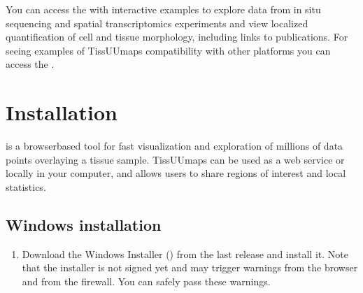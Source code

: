 \documentclass[letterpaper,10pt,english,openany,oneside]{sphinxmanual}
\begin{document}
\sphinxAtStartPar
You can access the  with interactive examples to explore data from in situ sequencing and spatial transcriptomics experiments and view localized quantification of cell and tissue morphology, including links to publications. For seeing examples of TissUUmaps compatibility with other platforms you can access the .

\sphinxstepscope


\section{Installation}
\label{\detokenize{docs/intro/installation:installation}}\label{\detokenize{docs/intro/installation::doc}}
\sphinxAtStartPar
{} is a browser\sphinxhyphen{}based tool for fast visualization and exploration of millions of data points overlaying a tissue sample. TissUUmaps can be used as a web service or locally in your computer, and allows users to share regions of interest and local statistics.


\subsection{Windows installation}
\label{\detokenize{docs/intro/installation:windows-installation}}\begin{enumerate}
%
\item {} 
\sphinxAtStartPar
Download the Windows Installer () from the last release and install it. Note that the installer is not signed yet and may trigger warnings from the browser and from the firewall. You can safely pass these warnings.

\end{enumerate}
\end{document}
